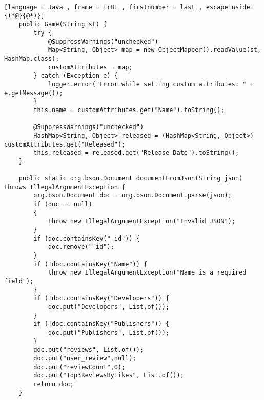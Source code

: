 \begin{lstlisting}[language = Java , frame = trBL , firstnumber = last , escapeinside={(*@}{@*)}]
    public Game(String st) {
        try {
            @SuppressWarnings("unchecked")
            Map<String, Object> map = new ObjectMapper().readValue(st, HashMap.class);
            customAttributes = map;
        } catch (Exception e) {
            logger.error("Error while setting custom attributes: " + e.getMessage());
        }
        this.name = customAttributes.get("Name").toString();

        @SuppressWarnings("unchecked")
        HashMap<String, Object> released = (HashMap<String, Object>) customAttributes.get("Released");
        this.released = released.get("Release Date").toString();
    }

    public static org.bson.Document documentFromJson(String json) throws IllegalArgumentException {
        org.bson.Document doc = org.bson.Document.parse(json);
        if (doc == null)
        {
            throw new IllegalArgumentException("Invalid JSON");
        }
        if (doc.containsKey("_id")) {
            doc.remove("_id");
        }
        if (!doc.containsKey("Name")) {
            throw new IllegalArgumentException("Name is a required field");
        }
        if (!doc.containsKey("Developers")) {
            doc.put("Developers", List.of());
        }
        if (!doc.containsKey("Publishers")) {
            doc.put("Publishers", List.of());
        }
        doc.put("reviews", List.of());
        doc.put("user_review",null);
        doc.put("reviewCount",0);
        doc.put("Top3ReviewsByLikes", List.of());
        return doc;
    }
\end{lstlisting}
